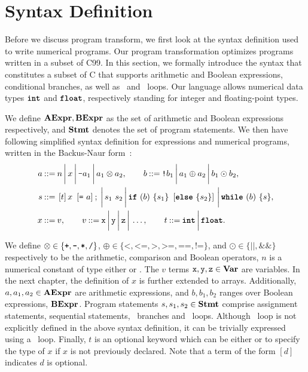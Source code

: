 \section{Syntax Definition}
\label{po:sec:syntax_definition}

Before we discuss program transform, we first look at the syntax definition
used to write numerical programs.  Our program transformation optimizes
programs written in a subset of C99.  In this section, we formally introduce
the syntax that constitutes a subset of C that supports arithmetic and Boolean
expressions, conditional branches, as well as \whilelit~and \forlit~loops.  Our
language allows numerical data types $\texttt{\textbf{int}}$ and $\texttt{\textbf{float}}$, respectively
standing for integer and floating-point types.

We define $\mathbf{AExpr}, \mathbf{BExpr}$ as the set of arithmetic and Boolean
expressions respectively, and $\mathbf{Stmt}$ denotes the set of program statements.
We then have following simplified syntax definition for expressions and
numerical programs, written in the Backus-Naur form~\cite{knuth64}:
\begin{equation}
    \begin{aligned}
        a \mathbin{::=} {} &
            n \,\bigg|\,
            x \,\bigg|\,
            \texttt{-}a_1 \,\bigg|\,
            a_1 \otimes a_2, \qquad
        b \mathbin{::=}
            \texttt{!}b_1 \,\bigg|\,
            a_1 \oplus a_2 \,\bigg|\,
            b_1 \odot b_2, \\
        s \mathbin{::=} {} &
            \left[ t \right] x~\left[ \texttt{=}~a \right] \mathbin{;} \,\bigg|\,
            s_1~s_2 \,\bigg|\,
            \texttt{\textbf{if}}~(b)~\{ s_1 \}~\left[\texttt{\textbf{else}}~\{ s_2 \}\right] \,\bigg|\,
            \texttt{\textbf{while}}~(b)~\{s\}, \\
        x \mathbin{::=} {} & v, \qquad
        v \mathbin{::=} \texttt{x} \,\bigg|\, \texttt{y} \,\bigg|\, \texttt{z} \,\bigg|\, \mathellipsis, \qquad
        t \mathbin{::=} \texttt{\textbf{int}} \,\bigg|\, \texttt{\textbf{float}}.
    \end{aligned}
    \label{po:eq:program_syntax}
\end{equation}

We define $\otimes \in \left\{ \texttt{+}, \texttt{-}, \texttt{*}, \texttt{/}
\right\}$, $\oplus \in \{ \texttt{<}, \texttt{<=}, \texttt{>}, \texttt{>=},
\texttt{==}, \texttt{!=} \}$, and $\odot \in \{ \texttt{||}, \texttt{\&\&}
\}$ respectively to be the arithmetic, comparison and Boolean operators,
$n$ is a numerical constant of type either \inttype{} or \floattype.  The
$v$ terms $\texttt{x}, \texttt{y}, \texttt{z} \in \mathbf{Var}$ are variables.  In the next
chapter, the definition of $x$ is further extended to arrays.  Additionally,
$a, a_1, a_2 \in \mathbf{AExpr}$ are arithmetic expressions, and $b, b_1, b_2$
ranges over Boolean expressions, $\mathbf{BExpr}$.  Program statements $s, s_1,
s_2 \in \mathbf{Stmt}$ comprise assignment statements, sequential statements,
\iflit~branches and \whilelit~loops.  Although \forlit~loop is not explicitly
defined in the above syntax definition, it can be trivially expressed using
a \whilelit~loop.  Finally, $t$ is an optional keyword which can be either
\inttype{} or \floattype{} to specify the type of $x$ if $x$ is not previously
declared.  Note that a term of the form $[d]$ indicates $d$ is optional.

